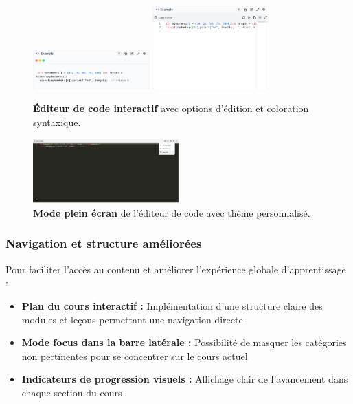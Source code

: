 \begin{figure}[h!]
  \centering
  \includegraphics[width=0.4\textwidth,keepaspectratio]{old-reports/week_4_img/pre_edit.jpeg}
  \includegraphics[width=0.4\textwidth,keepaspectratio]{old-reports/week_4_img/editmode.jpeg}
  \caption{\textbf{Éditeur de code interactif} avec options d'édition et coloration syntaxique.}
  \label{fig:code_editor}
\end{figure}

\begin{figure}[h!]
  \centering
  \includegraphics[width=0.5\textwidth,keepaspectratio]{old-reports/week_4_img/expended.jpeg}
  \caption{\textbf{Mode plein écran} de l'éditeur de code avec thème personnalisé.}
  \label{fig:code_editor_fullscreen}
\end{figure}

\subsubsection{Navigation et structure améliorées}

Pour faciliter l'accès au contenu et améliorer l'expérience globale d'apprentissage :
\begin{itemize}
    \item \textbf{Plan du cours interactif :} Implémentation d'une structure claire des modules et leçons permettant une navigation directe
    \item \textbf{Mode focus dans la barre latérale :} Possibilité de masquer les catégories non pertinentes pour se concentrer sur le cours actuel
    \item \textbf{Indicateurs de progression visuels :} Affichage clair de l'avancement dans chaque section du cours
\end{itemize}


